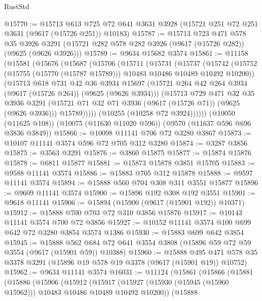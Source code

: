 \begin{lexlean}{RustStd}
\begin{coremodule}
@15770 := @15713
    @613
    @725
    @72
    @641
    @3631
    @3928
    (@15721 @251 @72 @251 @3631 (@9617 (@15726 @251)) @10183)
@15787 := @15713
    @723
    @471
    @578
    @35
    @3926
    @3291
    (@15721 @282 @578 @282 @3926 (@9617 (@15726 @282)) (@9625 (@9626 @3926)))
@15789 := @9634 @15682 @3574
@15861 := @11158
    (@15581
      (@15676
        (@15687
          (@15706
            (@15711
              (@15731
                (@15737
                  (@15742
                    (@15752 (@15755 (@15770 (@15787 @15789))) @10483 @10486 @10489 @10492 @10200))
                  (@15713
                    @618
                    @731
                    @42
                    @36
                    @3934
                    @15697
                    (@15721 @264 @42 @264 @3934 (@9617 (@15726 @264)) (@9625 (@9626 @3934)))
                    (@15713
                      @729
                      @471
                      @32
                      @35
                      @3936
                      @3291
                      (@15721 @71 @32 @71 @3936 (@9617 (@15726 @71)) (@9625 (@9626 @3936)))
                      @15789)))))
            (@10255 (@10258 @72 @3924))))))
    (@10050 (@11625 @108))
    (@10075 (@11630 @11020 @596))
    (@9570 (@11637 @596 @696 @3836 @3849))
@15866 := @10098 @11141 @706 @72 @3280 @3867
@15873 := @10107 @11141 @3574 @596 @72 @705 @312 @3280
@15874 := @3287 @3856
@15875 := @3563 @3291
@15876 := @3860 @15875
@15877 := @15874 @15876
@15878 := @6811 @15877
@15881 := @15873 @15878 @3851 @15705
@15883 := @9588 @11141 @3574
@15886 := @15883 @705 @312 @15878
@15888 := @9597 @11141 @3574
@15894 := @15888 @560 @704 @308 @311 @3551 @15877
@15896 := @9609 @11141 @3574
@15900 := @15896 @192 @308 @192 @3551
@15901 := @9618 @11141
@15906 := @15894 (@15900 (@9617 (@15901 @192)) @10371)
@15912 := @15888 @700 @703 @72 @310 @3856 @15876
@15917 := @10143 @11141 @3574 @700 @72 @3856
@15927 := @10152 @11141 @3574 @100 @699 @642 @72 @3280 @3854 @3574 @1386
@15930 := @15883 @699 @642 @3854
@15945 := @15888
    @562
    @684
    @72
    @641
    @3554
    @3808
    (@15896 @59 @72 @59 @3554 (@9617 (@15901 @59)) @10388)
@15960 := @15888
    @495
    @471
    @578
    @35
    @3378
    @3291
    (@15896 @19 @578 @19 @3378 (@9617 (@15901 @19)) @10752)
@15962 := @9634 @11141 @3574
@16031 := @11124
    (@15861
      (@15866
        (@15881
          (@15886
            (@15906
              (@15912
                (@15917
                  (@15927 (@15930 (@15945 (@15960 @15962))) @10483 @10486 @10489 @10492 @10200))
                (@15888

\end{coremodule}
\end{lexlean}

